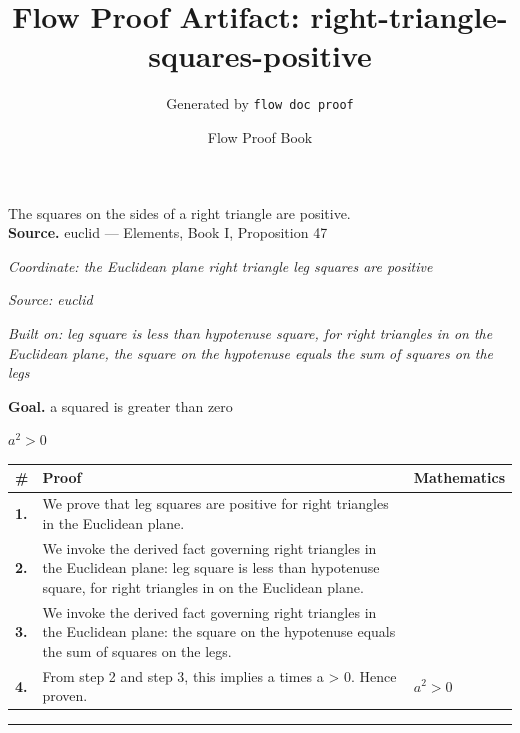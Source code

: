 \documentclass[11pt]{article}
\title{Flow Proof Artifact: right-triangle-squares-positive}
\author{Generated by \texttt{flow doc proof}}
\date{Flow Proof Book}
\theoremstyle{definition}
\begin{document}
\maketitle
The squares on the sides of a right triangle are positive.\\[0.5em]
\textbf{Source.} euclid — Elements, Book I, Proposition 47\\[0.5em]
\bigskip
{}\par
\smallskip\noindent\textit{Coordinate: the Euclidean plane \cdot right triangle \cdot leg squares are positive}\par
\smallskip\noindent\textit{Source: euclid}\par
\smallskip\noindent\textit{Built on: leg square is less than hypotenuse square, for right triangles in on the Euclidean plane, the square on the hypotenuse equals the sum of squares on the legs}\par
\medskip
\noindent\textbf{Goal.} a squared is greater than zero\par
\noindent$\displaystyle a^{2} > 0$\par
\medskip
\noindent
\begin{tabular}{@{} >{\raggedright\arraybackslash}p{} >{\raggedright\arraybackslash}p{} >{\raggedleft\arraybackslash}p{} @{}}
\textbf{\#} & \textbf{Proof} & \textbf{Mathematics} \\
\midrule
\textbf{1.} & We prove that leg squares are positive for right triangles in the Euclidean plane. & \\[0.45em]
\textbf{2.} & We invoke the derived fact governing right triangles in the Euclidean plane: leg square is less than hypotenuse square, for right triangles in on the Euclidean plane. & \\[0.45em]
\textbf{3.} & We invoke the derived fact governing right triangles in the Euclidean plane: the square on the hypotenuse equals the sum of squares on the legs. & \\[0.45em]
\textbf{4.} & From step 2 and step 3, this implies a times a > 0. Hence proven. & $\displaystyle a^{2} > 0$ \\[0.45em]
\bottomrule
\end{tabular}
\label{thm:Geometry-right triangle-leg_squares_are_positive}
\par\medskip\hrule
\end{document}
